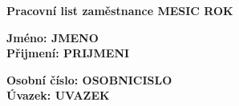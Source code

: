 \documentclass[10pt, a4paper]{article}%
\begin{document}
\clearpage
\begin{flushleft}%
	\Large\textbf{Pracovní list zaměstnance \hspace{2.85cm} MESIC ROK\\}
    \vspace*{0.5cm}
    \begin{minipage}{0.45\textwidth}
        \large\textbf{Jméno: JMENO}\\
        \large\textbf{Přijmení: PRIJMENI}
    \end{minipage}
    \hfill
    \begin{minipage}{0.45\textwidth}
        \large\textbf{Osobní číslo: OSOBNICISLO}\\
        \large\textbf{Úvazek: UVAZEK}
    \end{minipage}

\end{flushleft}
\end{document}
